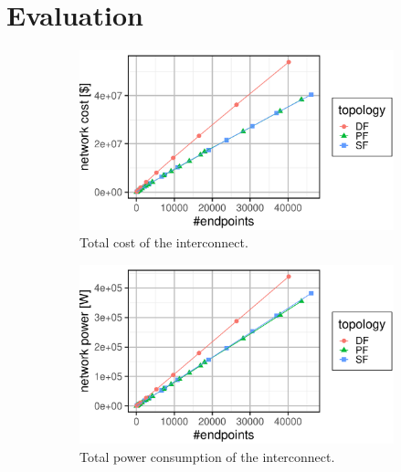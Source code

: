 \section{Evaluation} 
\label{sec:eval}

\begin{figure}[t]
\centering
{}
\begin{subfigure}[t]{0.49 \textwidth}
\centering
\includegraphics[width=1.0\columnwidth]{../../../plots/plot_cost_total.pdf}
%
\caption{\textmd{Total cost of the interconnect.}}
\label{fig:cost-total}
\end{subfigure}
\begin{subfigure}[t]{0.49 \textwidth}
\centering
\includegraphics[width=1.0\columnwidth]{../../../plots/plot_power_total.pdf}
%
\caption{\textmd{Total power consumption of the interconnect.}}
\label{fig:power-total}
\end{subfigure}
\vspace{1em}
%
%
%
\begin{subfigure}[t]{0.49 \textwidth}
\centering

\end{subfigure}
\end{figure}
